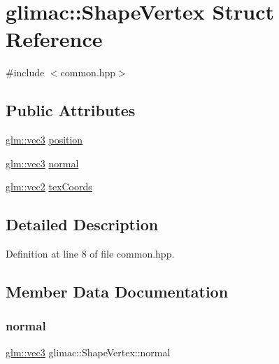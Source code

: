 \hypertarget{structglimac_1_1_shape_vertex}{}\section{glimac\+:\+:Shape\+Vertex Struct Reference}
\label{structglimac_1_1_shape_vertex}


{\ttfamily \#include $<$common.\+hpp$>$}

\subsection*{Public Attributes}
\begin{DoxyCompactItemize}
\item 
\hyperlink{group__core__types_ga1c47e8b3386109bc992b6c48e91b0be7}{glm\+::vec3} \hyperlink{structglimac_1_1_shape_vertex_a727bc4adace4f00e47069ce7373e3b97}{position}
\item 
\hyperlink{group__core__types_ga1c47e8b3386109bc992b6c48e91b0be7}{glm\+::vec3} \hyperlink{structglimac_1_1_shape_vertex_af8ef5c93da6bc86b5dcfa3d8e2a8fc21}{normal}
\item 
\hyperlink{group__core__types_gaa1618f51db67eaa145db101d8c8431d8}{glm\+::vec2} \hyperlink{structglimac_1_1_shape_vertex_ab694e76716c4cdc5e8636325b5fbeee2}{tex\+Coords}
\end{DoxyCompactItemize}


\subsection{Detailed Description}


Definition at line 8 of file common.\+hpp.



\subsection{Member Data Documentation}
\mbox{\label{structglimac_1_1_shape_vertex_af8ef5c93da6bc86b5dcfa3d8e2a8fc21}} 
\subsubsection{\texorpdfstring{normal}{normal}}
{\footnotesize\ttfamily \hyperlink{group__core__types_ga1c47e8b3386109bc992b6c48e91b0be7}{glm\+::vec3} glimac\+::\+Shape\+Vertex\+::normal}



